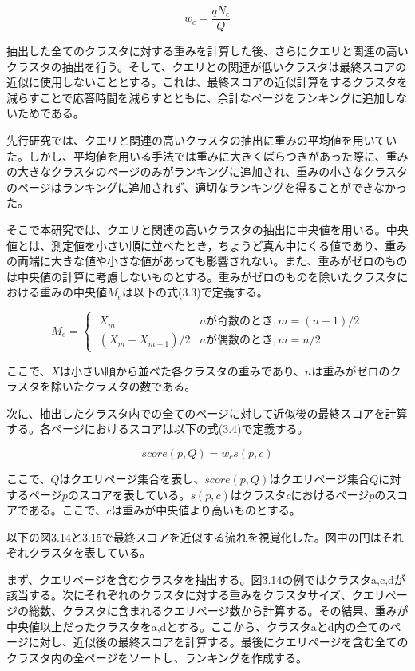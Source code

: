 \documentclass[a4paper,11pt]{jreport}
\begin{document}
\begin{equation}
w_c = \frac{qN_c}{Q}
\end{equation}

抽出した全てのクラスタに対する重みを計算した後、さらにクエリと関連の高いクラスタの抽出を行う。そして、クエリとの関連が低いクラスタは最終スコアの近似に使用しないこととする。これは、最終スコアの近似計算をするクラスタを減らすことで応答時間を減らすとともに、余計なページをランキングに追加しないためである。

先行研究では、クエリと関連の高いクラスタの抽出に重みの平均値を用いていた。しかし、平均値を用いる手法では重みに大きくばらつきがあった際に、重みの大きなクラスタのページのみがランキングに追加され、重みの小さなクラスタのページはランキングに追加されず、適切なランキングを得ることができなかった。

そこで本研究では、クエリと関連の高いクラスタの抽出に中央値を用いる。中央値とは、測定値を小さい順に並べたとき，ちょうど真ん中にくる値であり、重みの両端に大きな値や小さな値があっても影響されない。また、重みがゼロのものは中央値の計算に考慮しないものとする。重みがゼロのものを除いたクラスタにおける重みの中央値$M_e$は以下の式(3.3)で定義する。

\begin{equation}
M_e =
\begin{cases}
\; X_m & nが奇数のとき,m = (n+1) / 2 \\
\; (X_m + X_{m+1})/2 & nが偶数のとき,m = n/2
\end{cases}
\end{equation}

ここで、$X$は小さい順から並べた各クラスタの重みであり、$n$は重みがゼロのクラスタを除いたクラスタの数である。

次に、抽出したクラスタ内での全てのページに対して近似後の最終スコアを計算する。各ページにおけるスコアは以下の式(3.4)で定義する。

\begin{equation}
score(p,Q) = w_cs(p,c)
\end{equation}

ここで、$Q$はクエリページ集合を表し、$score(p,Q)$はクエリページ集合$Q$に対するページ$p$のスコアを表している。$s(p,c)$はクラスタ$c$におけるページ$p$のスコアである。ここで、$c$は重みが中央値より高いものとする。

以下の図3.14と3.15で最終スコアを近似する流れを視覚化した。図中の円はそれぞれクラスタを表している。

まず、クエリページを含むクラスタを抽出する。図3.14の例ではクラスタa,c,dが該当する。次にそれぞれのクラスタに対する重みをクラスタサイズ、クエリページの総数、クラスタに含まれるクエリページ数から計算する。その結果、重みが中央値以上だったクラスタをa,dとする。ここから、クラスタaとd内の全てのページに対し、近似後の最終スコアを計算する。最後にクエリページを含む全てのクラスタ内の全ページをソートし、ランキングを作成する。
\end{document}
